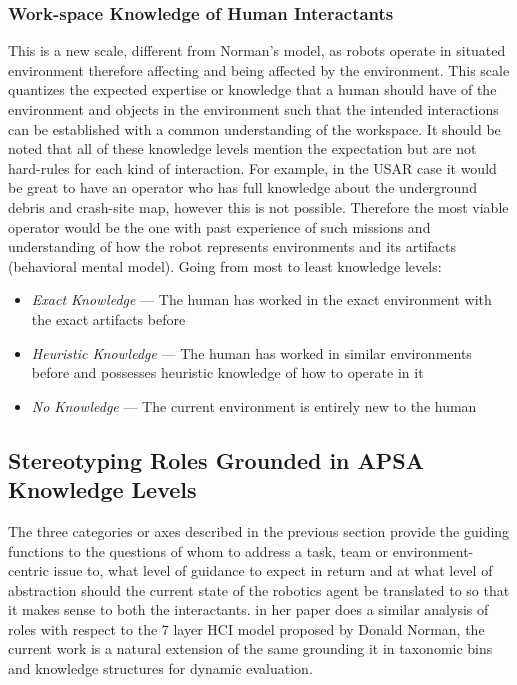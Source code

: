 \documentclass[letterpaper, 10 pt, conference]{ieeeconf} %
\theoremstyle{definition} \newtheorem{definition}{Definition}
\begin{document}
\subsubsection{Work-space Knowledge of Human Interactants}
This is a new scale, different from Norman's model, as robots operate in
situated environment therefore affecting and being affected by the environment.
This scale quantizes the expected expertise or knowledge that a human should
have of the environment and objects in the environment such that the intended
interactions can be established with a common understanding of the workspace. It
should be noted that all of these knowledge levels mention the expectation but
are not hard-rules for each kind of interaction. For example, in the USAR case
it would be great to have an operator who has full knowledge about the
underground debris and crash-site map, however this is not possible. Therefore
the most viable operator would be the one with past experience of such missions
and understanding of how the robot represents environments and its artifacts
(behavioral mental model). Going from most to least knowledge levels:
\begin{itemize}{}
  \item \textit{Exact Knowledge} --- The human has worked in the exact
        environment with the exact artifacts before
  \item \textit{Heuristic Knowledge} --- The human has worked in similar
        environments before and possesses heuristic knowledge of how to operate in
        it
  \item \textit{No Knowledge} --- The current environment is entirely new to the
        human

\end{itemize}

\subsection{Stereotyping Roles Grounded in APSA Knowledge Levels}

The three categories or axes described in the previous section provide the
guiding functions to the questions of whom to address a task, team or
environment-centric issue to, what level of guidance to expect in return and at
what level of abstraction should the current state of the robotics agent be
translated to so that it makes sense to both the interactants.
\citeauthor{Scholtz2003} in her \citeyear{Scholtz2003} paper does a similar
analysis of roles with respect to the 7 layer HCI model proposed by Donald
Norman, the current work is a natural extension of the same grounding it in
taxonomic bins and knowledge structures for dynamic evaluation.
\end{document}
